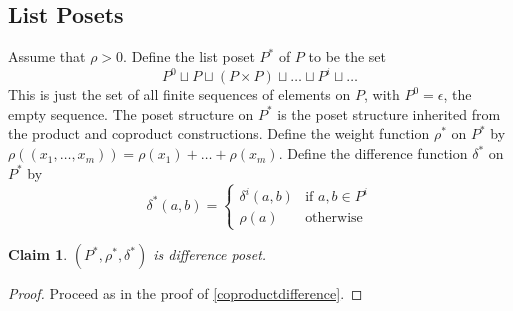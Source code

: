 \documentclass[acmsmall,review,anonymous]{acmart}\settopmatter{printfolios=true,printccs=false,printacmref=false}
\newtheorem{claim}{Claim}
\begin{document}
\subsection{List Posets}
Assume that $\rho > 0$. Define the list poset $P^*$ of $P$ to be the set
$$P^0 \sqcup P \sqcup (P \times P) \sqcup \ldots \sqcup P^i \sqcup \ldots$$
This is just the set of all finite sequences of elements on $P$, with $P^0 =
\epsilon$, the empty sequence. The poset structure on $P^*$ is the poset
structure inherited from the product and coproduct constructions. Define the
weight function $\rho^*$ on $P^*$ by $\rho((x_1, \ldots, x_m)) = \rho(x_1) +
\ldots + \rho(x_m)$. Define the difference function $\delta^*$ on $P^*$ by
$$\delta^*(a, b) =
\begin{cases}
\delta^i(a, b) &\text{if }a, b \in P^i\\
\rho(a) & \text{otherwise}
\end{cases}$$
\begin{claim}
$(P^*, \rho^*, \delta^*)$ is difference poset.
\end{claim}
\begin{proof}
Proceed as in the proof of \cref{coproductdifference}.
\end{proof}
\end{document}
